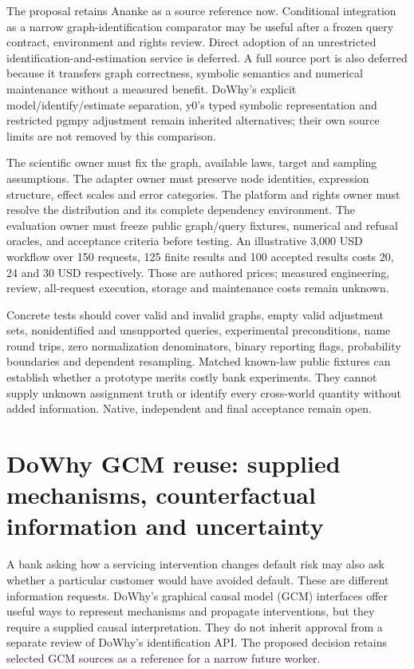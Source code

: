 The proposal retains Ananke as a source reference now. Conditional integration
as a narrow graph-identification comparator may be useful after a frozen
query contract, environment and rights review. Direct adoption of an
unrestricted identification-and-estimation service is deferred. A full
source port is also deferred because it transfers graph correctness,
symbolic semantics and numerical maintenance without a measured benefit.
DoWhy's explicit model/identify/estimate separation, y0's typed symbolic
representation and restricted pgmpy adjustment remain inherited alternatives;
their own source limits are not removed by this comparison.
\citep{exec24_ananke_choice}

The scientific owner must fix the graph, available laws, target and
sampling assumptions. The adapter owner must preserve node identities,
expression structure, effect scales and error categories. The platform
and rights owner must resolve the distribution and its complete dependency
environment. The evaluation owner must freeze public graph/query fixtures,
numerical and refusal oracles, and acceptance criteria before testing.
An illustrative 3,000 USD workflow over 150 requests, 125 finite results
and 100 accepted results costs 20, 24 and 30 USD respectively. Those are
authored prices; measured engineering, review, all-request execution,
storage and maintenance costs remain unknown.
\citep{exec24_ananke_choice}

Concrete tests should cover valid and invalid graphs, empty valid adjustment
sets, nonidentified and unsupported queries, experimental preconditions,
name round trips, zero normalization denominators, binary reporting flags,
probability boundaries and dependent resampling. Matched known-law public
fixtures can establish whether a prototype merits costly bank experiments.
They cannot supply unknown assignment truth or identify every cross-world
quantity without added information. Native, independent and final
acceptance remain open.~\citep{exec24_ananke_choice}


\section{DoWhy GCM reuse: supplied mechanisms, counterfactual information and uncertainty}
\label{sec:exec24-gcm-reuse}

A bank asking how a servicing intervention changes default risk may also
ask whether a particular customer would have avoided default. These are
different information requests. DoWhy's graphical causal model (GCM)
interfaces offer useful ways to represent mechanisms and propagate
interventions, but they require a supplied causal interpretation. They do
not inherit approval from a separate review of DoWhy's identification API.
The proposed decision retains selected GCM sources as a reference for a
narrow future worker.~\citep{exec24_gcm_source,exec24_gcm_choice}


